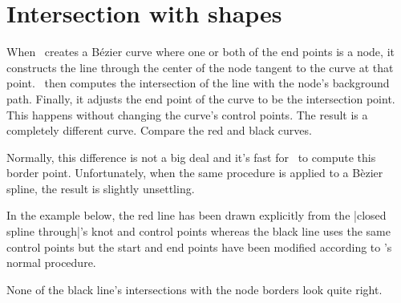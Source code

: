 \documentclass[a4paper]{ltxdoc}
\begin{document}
\section{Intersection with shapes}
When \tikzname\ creates a B\'ezier curve where one or both of the end points
is a node, it constructs the line through the center of the node tangent to
the curve at that point. \tikzname\ then computes the intersection of the line
with the node's background path. Finally, it adjusts the end point of the
curve to be the intersection point. This happens without changing the curve's
control points. The result is a completely different curve. Compare the red
and black curves.
\begin{codeexample}[]
\end{codeexample}

Normally, this difference is not a big deal and it's fast for \pgfname\ to
compute this border point. Unfortunately, when the same procedure is applied
to a B\`ezier spline, the result is slightly unsettling.

In the example below, the red line has been drawn explicitly from the
|closed spline through|'s knot and control points whereas the black line uses
the same control points but the start and end points have been modified
according to \tikzname's normal procedure.
\begin{codeexample}[]
\end{codeexample}
None of the black line's intersections with the node borders look quite right.
\end{document}
